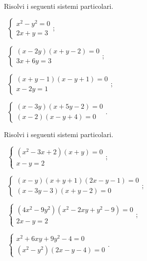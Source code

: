 \begin{esercizio}
\label{ese:6.45}
Risolvi i seguenti sistemi particolari.
\begin{multicols}{2}
 \begin{enumeratea}
 \item~$\left\{\begin{array}{l}x^2-y^2=0\\2x+y=3\end{array}\right.$;
 \item~$\left\{\begin{array}{l}(x-2y)(x+y-2)=0\\3x+6y=3\end{array}\right.$;
 \item~$\left\{\begin{array}{l}(x+y-1)(x-y+1)=0\\x-2y=1\end{array}\right.$;
 \item~$\left\{\begin{array}{l}(x-3y)(x+5y-2)=0\\(x-2)(x-y+4)=0\end{array}\right.$.
 \end{enumeratea}
\end{multicols}
\end{esercizio}

\begin{esercizio}[\Ast]
\label{ese:6.46}
Risolvi i seguenti sistemi particolari.
\begin{multicols}{2}
 \begin{enumeratea}
 \item~$\left\{\begin{array}{l}(x^2-3x+2)(x+y)=0\\x-y=2\end{array}\right.$;
 \item~$\left\{\begin{array}{l}(x-y)(x+y+1)(2x-y-1)=0\\(x-3y-3)(x+y-2)=0\end{array}\right.$;
 \item~$\left\{\begin{array}{l}(4x^2-9y^2)(x^2-2xy+y^2-9)=0 \\2x-y=2 \end{array}\right.$;
 \item~$\left\{\begin{array}{l}x^2+6xy+9y^2-4=0\\(x^2-y^2)(2x-y-4)=0\end{array}\right.$.
 \end{enumeratea}
\end{multicols}
\end{esercizio}

